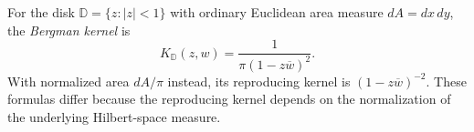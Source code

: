 
For the disk $\mathbb D=\{z:|z|<1\}$ with ordinary Euclidean area measure $dA=dx\,dy$, the \emph{Bergman kernel} is
\[
K_{\mathbb D}(z,w)=\frac{1}{\pi(1-z\overline w)^2}.
\]
With normalized area $dA/\pi$ instead, its reproducing kernel is $(1-z\overline w)^{-2}$. These formulas differ because the reproducing kernel depends on the normalization of the underlying Hilbert-space measure.
